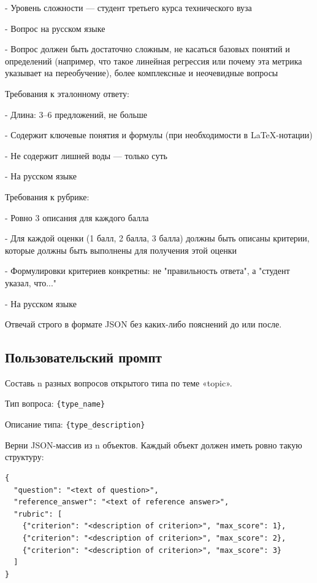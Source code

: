 - Уровень сложности — студент третьего курса технического вуза

- Вопрос на русском языке

- Вопрос должен быть достаточно сложным, не касаться базовых
  понятий и определений (например, что такое линейная регрессия
  или почему эта метрика указывает на переобучение),
  более комплексные и неочевидные вопросы

\vspace{1em}
Требования к эталонному ответу:

- Длина: 3–6 предложений, не больше

- Содержит ключевые понятия и формулы
  (при необходимости в LaTeX-нотации)

- Не содержит лишней воды — только суть

- На русском языке
  
\vspace{1em}
Требования к рубрике:

- Ровно 3 описания для каждого балла

- Для каждой оценки (1 балл, 2 балла, 3 балла) должны быть
  описаны критерии, которые должны быть выполнены для получения
  этой оценки

- Формулировки критериев конкретны: не "правильность ответа",
  а "студент указал, что..."

- На русском языке
  
\vspace{1em}
Отвечай строго в формате JSON без каких-либо пояснений до или
после.
 
\subsection{Пользовательский промпт}
 
Составь {n} разных вопросов открытого типа по теме «{topic}».
  
\vspace{1em}
Тип вопроса: \verb|{type_name}|
  
\vspace{1em}
Описание типа: \verb|{type_description}|
  
\vspace{1em}
Верни JSON-массив из {n} объектов. Каждый объект должен иметь
ровно такую структуру:
  
\vspace{1em}
\begin{verbatim}
{
  "question": "<text of question>",
  "reference_answer": "<text of reference answer>",
  "rubric": [
    {"criterion": "<description of criterion>", "max_score": 1},
    {"criterion": "<description of criterion>", "max_score": 2},
    {"criterion": "<description of criterion>", "max_score": 3}
  ]
}
\end{verbatim}
   
